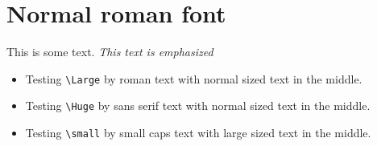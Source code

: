 ﻿\documentclass{article}
\begin{document}
\section{Normal roman font}

This is some text.  \emph{This text is emphasized}
\begin{itemize}
\item
Testing \verb#\Large# by {\Large roman text with {\normalsize normal sized text} in the middle}.
\item
Testing \verb#\Huge# by {\sf\Huge sans serif text with {\normalsize normal sized text} in the middle}.
\item
Testing \verb#\small# by {\sc\small small caps text with {\large large sized text} in the middle}.
\end{itemize}
\end{document}
